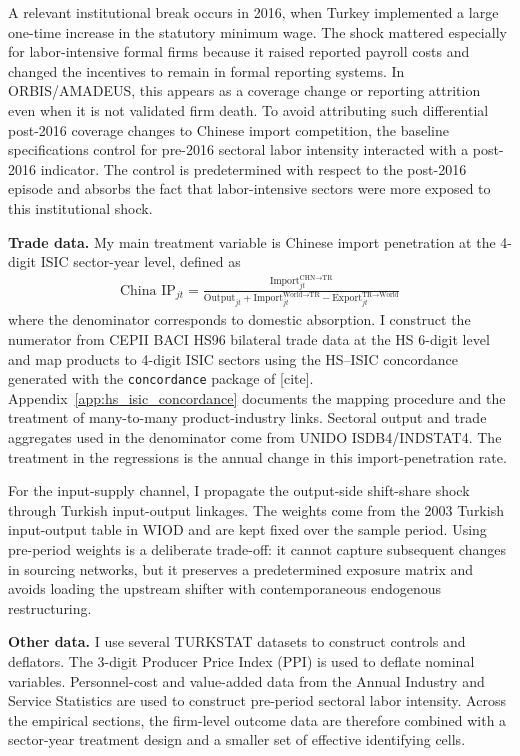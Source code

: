 \documentclass[12pt]{article}
\newcommand{\textcite}[2][]{[cite]}
\begin{document}
A relevant institutional break occurs in 2016, when Turkey implemented a large one-time increase in the statutory minimum wage. The shock mattered especially for labor-intensive formal firms because it raised reported payroll costs and changed the incentives to remain in formal reporting systems. In ORBIS/AMADEUS, this appears as a coverage change or reporting attrition even when it is not validated firm death. To avoid attributing such differential post-2016 coverage changes to Chinese import competition, the baseline specifications control for pre-2016 sectoral labor intensity interacted with a post-2016 indicator. The control is predetermined with respect to the post-2016 episode and absorbs the fact that labor-intensive sectors were more exposed to this institutional shock.

\textbf{Trade data.} My main treatment variable is Chinese import penetration at the 4-digit ISIC sector-year level, defined as
\begin{equation}
    \begin{aligned}
    \text{China IP}_{jt} = \frac{\text{Import}_{jt}^{\text{CHN} \to \text{TR}}}{\text{Output}_{jt} + \text{Import}_{jt}^{\text{World} \to \text{TR}} - \text{Export}_{jt}^{\text{TR} \to \text{World}}} 
\end{aligned}
\end{equation}
where the denominator corresponds to domestic absorption. I construct the numerator from CEPII BACI HS96 bilateral trade data at the HS 6-digit level and map products to 4-digit ISIC sectors using the HS--ISIC concordance generated with the \texttt{concordance} package of \textcite{liaoConcordanceProductConcordance2020}. Appendix~\ref{app:hs_isic_concordance} documents the mapping procedure and the treatment of many-to-many product-industry links. Sectoral output and trade aggregates used in the denominator come from UNIDO ISDB4/INDSTAT4. The treatment in the regressions is the annual change in this import-penetration rate.

For the input-supply channel, I propagate the output-side shift-share shock through Turkish input-output linkages. The weights come from the 2003 Turkish input-output table in WIOD and are kept fixed over the sample period. Using pre-period weights is a deliberate trade-off: it cannot capture subsequent changes in sourcing networks, but it preserves a predetermined exposure matrix and avoids loading the upstream shifter with contemporaneous endogenous restructuring.

\textbf{Other data.} I use several TURKSTAT datasets to construct controls and deflators. The 3-digit Producer Price Index (PPI) is used to deflate nominal variables. Personnel-cost and value-added data from the Annual Industry and Service Statistics are used to construct pre-period sectoral labor intensity. Across the empirical sections, the firm-level outcome data are therefore combined with a sector-year treatment design and a smaller set of effective identifying cells.
\end{document}

